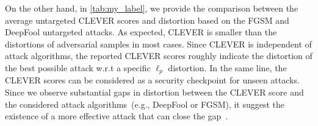 \hspace*{3.5mm} On the other hand, in \cref{tab:my_label}, we provide the comparison between the average untargeted CLEVER scores and distortion based on the FGSM and DeepFool untargeted attacks. As expected, CLEVER is smaller than the distortions of adversarial samples in most cases. 
Since CLEVER is independent of attack algorithms, the reported CLEVER scores roughly indicate the distortion of the best possible attack w.r.t a specific $\ell_{p}$ distortion. In the same line, the CLEVER scores can be considered as a security checkpoint for unseen attacks. Since we observe substantial gaps in distortion between the CLEVER score and the considered attack algorithms~(e.g., DeepFool or FGSM), it suggest the existence of a more effective attack that can close the gap~\cite{weng2018evaluating}.

